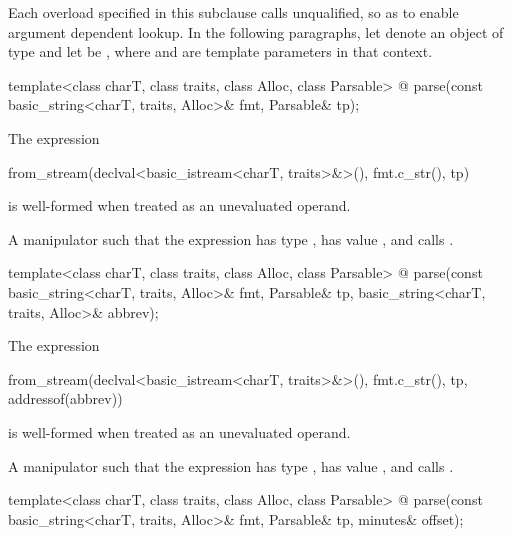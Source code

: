 \pnum
Each  overload specified in this subclause
calls  unqualified,
so as to enable argument dependent lookup.
In the following paragraphs,
let  denote an object of type  and
let  be ,
where  and  are template parameters in that context.

\begin{itemdecl}
template<class charT, class traits, class Alloc, class Parsable>
  @\unspec@
    parse(const basic_string<charT, traits, Alloc>& fmt, Parsable& tp);
\end{itemdecl}

\begin{itemdescr}
\pnum
\constraints
The expression
\begin{codeblock}
from_stream(declval<basic_istream<charT, traits>&>(), fmt.c_str(), tp)
\end{codeblock}
is well-formed when treated as an unevaluated operand.

\pnum
\returns
A manipulator such that
the expression 
has type ,
has value , and
calls .
\end{itemdescr}

\begin{itemdecl}
template<class charT, class traits, class Alloc, class Parsable>
  @\unspec@
    parse(const basic_string<charT, traits, Alloc>& fmt, Parsable& tp,
          basic_string<charT, traits, Alloc>& abbrev);
\end{itemdecl}

\begin{itemdescr}
\pnum
\constraints
The expression
\begin{codeblock}
from_stream(declval<basic_istream<charT, traits>&>(), fmt.c_str(), tp, addressof(abbrev))
\end{codeblock}
is well-formed when treated as an unevaluated operand.

\pnum
\returns
A manipulator such that
the expression 
has type ,
has value , and
calls .
\end{itemdescr}

\begin{itemdecl}
template<class charT, class traits, class Alloc, class Parsable>
  @\unspec@
    parse(const basic_string<charT, traits, Alloc>& fmt, Parsable& tp,
          minutes& offset);
\end{itemdecl}

